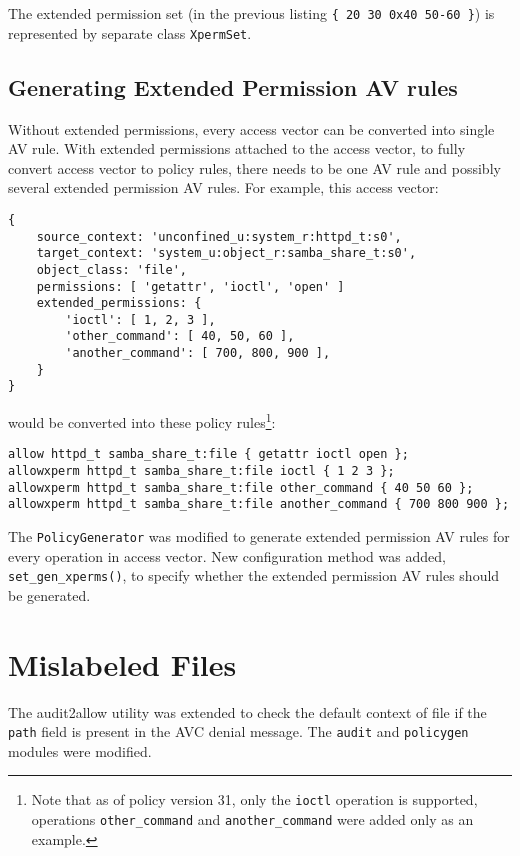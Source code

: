 The extended permission set (in the previous listing \texttt{\{ 20 30 0x40 50-60
\}}) is represented by separate class \texttt{XpermSet}.

\subsection{Generating Extended Permission AV rules}
Without extended permissions, every access vector can be converted into single
AV rule. With extended permissions attached to the access vector, to fully
convert access vector to policy rules, there needs to be one AV rule and
possibly several extended permission AV rules. For example, this access vector:
\begin{lstlisting}
{
    source_context: 'unconfined_u:system_r:httpd_t:s0',
    target_context: 'system_u:object_r:samba_share_t:s0',
    object_class: 'file',
    permissions: [ 'getattr', 'ioctl', 'open' ]
    extended_permissions: {
        'ioctl': [ 1, 2, 3 ],
        'other_command': [ 40, 50, 60 ],
        'another_command': [ 700, 800, 900 ],
    }
}
\end{lstlisting}
would be converted into these policy rules\footnote{Note that as of policy
version 31, only the \texttt{ioctl} operation is supported, operations
\texttt{other\_command} and \texttt{another\_command} were added only as an
example.}:
\begin{lstlisting}
allow httpd_t samba_share_t:file { getattr ioctl open };
allowxperm httpd_t samba_share_t:file ioctl { 1 2 3 };
allowxperm httpd_t samba_share_t:file other_command { 40 50 60 };
allowxperm httpd_t samba_share_t:file another_command { 700 800 900 };
\end{lstlisting}

The \texttt{PolicyGenerator} was modified to generate extended permission AV
rules for every operation in access vector. New configuration method was added,
\texttt{set\_gen\_xperms()}, to specify whether the extended permission AV rules
should be generated.

\section{Mislabeled Files}
The audit2allow utility was extended to check the default context of file if the
\texttt{path} field is present in the AVC denial message. The \texttt{audit} and
\texttt{policygen} modules were modified.

